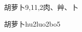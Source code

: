 \begin{entry}{胡萝卜}{9,11,2}{⾁、⾋、⼘}
  \begin{phonetics}{胡萝卜}{hu2luo2bo5}
  \end{phonetics}
\end{entry}

